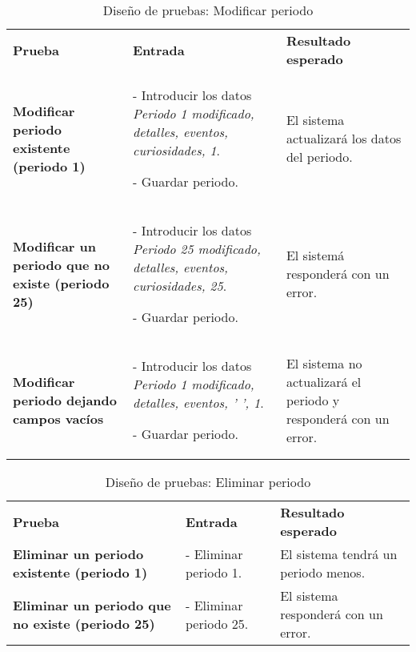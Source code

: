 \begin{table}[H]
\vspace{-4mm}
  \centering
  \caption{Diseño de pruebas: Modificar periodo}
    \begin{tabular}{p{10em}p{13em}p{14em}}
    \toprule
    \rowcolor[rgb]{ .851,  .886,  .953} \multicolumn{3}{p{36em}}{\textbf{Modificar periodo}} \\ \midrule
    \rowcolor[rgb]{ .949,  .949,  .949} \textbf{Prueba} & \textbf{Entrada} & \textbf{Resultado esperado}\\ \midrule
    \textbf{Modificar periodo existente (periodo 1)} & - Introducir los datos \textit{Periodo 1 modificado, detalles, eventos, curiosidades, 1}.\par - Guardar periodo. & El sistema actualizará los datos del periodo. \\ \midrule
    \textbf{Modificar un periodo que no existe (periodo 25)} & - Introducir los datos \textit{Periodo 25 modificado, detalles, eventos, curiosidades, 25}.\par - Guardar periodo. & El sistemá responderá con un error. \\ \midrule
    \textbf{Modificar periodo dejando campos vacíos} & - Introducir los datos \textit{Periodo 1 modificado, detalles, eventos, ' ', 1}.\par - Guardar periodo. & El sistema no actualizará el periodo y responderá con un error. \\ \bottomrule
    \end{tabular}%
\end{table}%
\begin{table}[H]
\vspace{-4mm}
  \centering
  \caption{Diseño de pruebas: Eliminar periodo}
    \begin{tabular}{p{11em}p{11em}p{14em}}
    \toprule
    \rowcolor[rgb]{ .851,  .886,  .953} \multicolumn{3}{p{36em}}{\textbf{Eliminar periodo}} \\ \midrule
    \rowcolor[rgb]{ .949,  .949,  .949} \textbf{Prueba} & \textbf{Entrada} & \textbf{Resultado esperado}\\ \midrule
    \textbf{Eliminar un periodo existente (periodo 1)} & - Eliminar periodo 1.  & El sistema tendrá un periodo menos. \\ \midrule
    \textbf{Eliminar un periodo que no existe (periodo 25)} & - Eliminar periodo 25.  & El sistema responderá con un error. \\ \bottomrule
    \end{tabular}%
\end{table}%
